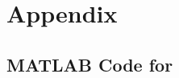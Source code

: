 \renewcommand{\thesubsection}{\thesection.\arabic{subsection}}
\appendix
\section{Appendix}

\subsection{MATLAB Code for }
\label{apdx:matlab}
\begin{center}
	
\end{center}
